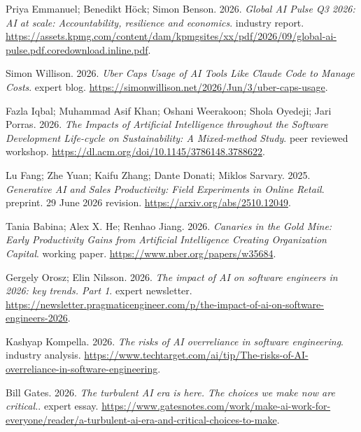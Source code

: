 {\begin{description}[leftmargin=2em,labelwidth=1.5em,itemsep=1pt,parsep=0pt]
\item[100.] \hypertarget{ref-kpmgpulseq32026}{} Priya Emmanuel; Benedikt Höck; Simon Benson. 2026. \textit{Global AI Pulse Q3 2026: AI at scale: Accountability, resilience and economics}. industry report. \url{https://assets.kpmg.com/content/dam/kpmgsites/xx/pdf/2026/09/global-ai-pulse.pdf.coredownload.inline.pdf}.

\item[101.] \hypertarget{ref-uber2026}{} Simon Willison. 2026. \textit{Uber Caps Usage of AI Tools Like Claude Code to Manage Costs}. expert blog. \url{https://simonwillison.net/2026/Jun/3/uber-caps-usage}.

\item[102.] \hypertarget{ref-iqbal2026}{} Fazla Iqbal; Muhammad Asif Khan; Oshani Weerakoon; Shola Oyedeji; Jari Porras. 2026. \textit{The Impacts of Artificial Intelligence throughout the Software Development Life-cycle on Sustainability: A Mixed-method Study}. peer reviewed workshop. \url{https://dl.acm.org/doi/10.1145/3786148.3788622}.

\item[103.] \hypertarget{ref-retail2025}{} Lu Fang; Zhe Yuan; Kaifu Zhang; Dante Donati; Miklos Sarvary. 2025. \textit{Generative AI and Sales Productivity: Field Experiments in Online Retail}. preprint. 29 June 2026 revision. \url{https://arxiv.org/abs/2510.12049}.

\item[104.] \hypertarget{ref-babina2026}{} Tania Babina; Alex X. He; Renhao Jiang. 2026. \textit{Canaries in the Gold Mine: Early Productivity Gains from Artificial Intelligence Creating Organization Capital}. working paper. \url{https://www.nber.org/papers/w35684}.

\item[105.] \hypertarget{ref-pragmatic2026}{} Gergely Orosz; Elin Nilsson. 2026. \textit{The impact of AI on software engineers in 2026: key trends. Part 1}. expert newsletter. \url{https://newsletter.pragmaticengineer.com/p/the-impact-of-ai-on-software-engineers-2026}.

\item[106.] \hypertarget{ref-kompella2026}{} Kashyap Kompella. 2026. \textit{The risks of AI overreliance in software engineering}. industry analysis. \url{https://www.techtarget.com/ai/tip/The-risks-of-AI-overreliance-in-software-engineering}.

\item[107.] \hypertarget{ref-gates2026}{} Bill Gates. 2026. \textit{The turbulent AI era is here. The choices we make now are critical.}. expert essay. \url{https://www.gatesnotes.com/work/make-ai-work-for-everyone/reader/a-turbulent-ai-era-and-critical-choices-to-make}.


\end{description}}
